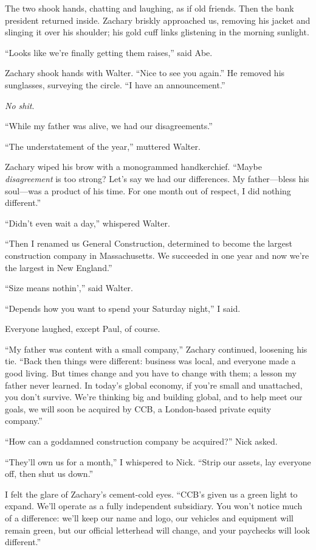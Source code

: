The two shook hands, chatting and laughing, as if old friends. Then the
bank president returned inside. Zachary briskly approached us, removing
his jacket and slinging it over his shoulder; his gold cuff links
glistening in the morning sunlight.

``Looks like we're finally getting them raises,'' said Abe.

Zachary shook hands with Walter. ``Nice to see you again.'' He removed
his sunglasses, surveying the circle. ``I have an announcement.''

\emph{No shit}.

``While my father was alive, we had our disagreements.''

``The understatement of the year,'' muttered Walter.

Zachary wiped his brow with a monogrammed handkerchief. ``Maybe
\emph{disagreement} is too strong? Let's say we had our differences. My
father---bless his soul---was a product of his time. For one month out
of respect, I did nothing different.''

``Didn't even wait a day,'' whispered Walter.

``Then I renamed us General Construction, determined to become the
largest construction company in Massachusetts. We succeeded in one year
and now we're the largest in New England.''

``Size means nothin','' said Walter.

``Depends how you want to spend your Saturday night,'' I said.

Everyone laughed, except Paul, of course.

``My father was content with a small company,'' Zachary continued,
loosening his tie. ``Back then things were different: business was
local, and everyone made a good living. But times change and you have to
change with them; a lesson my father never learned. In today's global
economy, if you're small and unattached, you don't survive. We're
thinking big and building global, and to help meet our goals, we will
soon be acquired by CCB, a London-based private equity company.''

``How can a goddamned construction company be acquired?'' Nick asked.

``They'll own us for a month,'' I whispered to Nick. ``Strip our assets,
lay everyone off, then shut us down.''

I felt the glare of Zachary's cement-cold eyes. ``CCB's given us a green
light to expand. We'll operate as a fully independent subsidiary. You
won't notice much of a difference: we'll keep our name and logo, our
vehicles and equipment will remain green, but our official letterhead
will change, and your paychecks will look different.''


